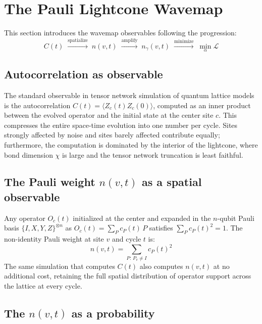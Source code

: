 \documentclass[letterpaper]{article}
\begin{document}
\section{The Pauli Lightcone Wavemap}
\label{sec:wavemap}
This section introduces the wavemap observables following the progression:
\begin{equation}
  C(t) \;\xrightarrow{\text{spatialize}}\; n(v,t)
       \;\xrightarrow{\text{amplify}}\; n_\gamma(v,t)
       \;\xrightarrow{\text{minimize}}\; \min_\alpha \mathcal{L}
  \label{eq:progression}
\end{equation}
\subsection{Autocorrelation as observable}

The standard observable in tensor network simulation of quantum lattice
models is the autocorrelation $C(t) = \langle Z_c(t) Z_c(0)\rangle$,
computed as an inner product between the evolved operator and the
initial state at the center site $c$.
This compresses the entire space-time evolution into one number per cycle.
Sites strongly affected by noise and sites barely affected contribute
equally; furthermore, the computation is dominated by the interior of
the lightcone, where bond dimension $\chi$ is large and the tensor
network truncation is least faithful.

\subsection{The Pauli weight $n(v,t)$ as a spatial observable}

Any operator $O_c(t)$ initialized at the center and expanded in the
$n$-qubit Pauli basis $\{I,X,Y,Z\}^{\otimes n}$ as
$O_c(t) = \sum_P c_P(t)\,P$ satisfies $\sum_P c_P(t)^2 = 1$.
The non-identity Pauli weight at site $v$ and cycle $t$ is:
\begin{equation}
    n(v,t) = \sum_{P:\,P_v \neq I} c_P(t)^2
    \label{eq:nvt}
\end{equation}
The same simulation that computes $C(t)$ also computes $n(v,t)$ at no
additional cost, retaining the full spatial distribution of operator
support across the lattice at every cycle.


\subsection{The $n(v,t)$ as a probability}
\end{document}

